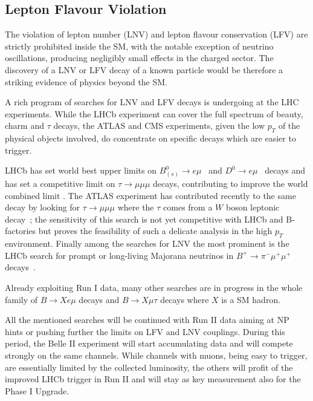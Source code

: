 \subsection{Lepton Flavour Violation}

The violation of lepton number (LNV) and lepton flavour conservation (LFV) are strictly prohibited
inside the SM, with the notable exception of neutrino oscillations, producing negligibly 
small effects in the charged sector. 
The discovery of a LNV or LFV decay of a known particle would be therefore a striking evidence 
of physics beyond the SM. 

A rich program of searches for LNV and LFV decays is undergoing at the LHC experiments. 
While the LHCb experiment can cover the full spectrum of beauty, charm and $\tau$ decays, 
the ATLAS and CMS experiments, given the low $p_T$ of the physical objects involved, do concentrate on specific decays which are easier to trigger. 

LHCb has set world best upper limits on $B^0_{(s)} \to e \mu$~\cite{Aaij:2013cby} 
and $D^0 \to e \mu$~\cite{Aaij:2015qmj} decays and has set a competitive
limit on $\tau \to \mu\mu\mu$ decays, contributing to improve the world combined limit \cite{Aaij:2014azz}. 
The ATLAS experiment has contributed recently to the same decay by looking for $\tau \to \mu\mu\mu$
where the $\tau$ comes from a $W$ boson leptonic decay~\cite{Aad:2016wce}; the sensitivity of this search is not yet 
competitive with LHCb and B-factories but proves the feasibility of such a delicate analysis in the high $p_T$ 
environment. 
Finally among the searches for LNV the most prominent is the LHCb search for prompt or long-living Majorana neutrinos 
in $B^+\to \pi^- \mu^+ \mu^+$ decays~\cite{Aaij:2012zr}.

Already exploiting Run I data, many other searches are in progress in the whole family of $B\to X e\mu$ decays and 
$B\to X \mu\tau$ decays where $X$ is a SM hadron. 

All the mentioned searches will be continued with Run II data aiming at NP hints or pushing further the limits on 
LFV and LNV couplings. 
During this period, the Belle II experiment will start accumulating data and will compete strongly on the same channels. 
While channels with muons, being easy to trigger, are essentially limited by the collected luminosity, the others will
profit of the improved LHCb trigger in Run II and will stay as key measurement also for the Phase I Upgrade. 


